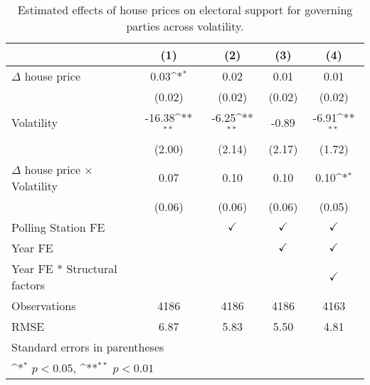 \begin{table}[htbp]\centering
\def\sym#1{\ifmmode^{#1}\else\(^{#1}\)\fi}
\caption{Estimated effects of house prices on electoral support for governing parties across volatility.}
\begin{tabular}{l*{4}{c}}
\hline\hline
                    &\multicolumn{1}{c}{(1)}        &\multicolumn{1}{c}{(2)}        &\multicolumn{1}{c}{(3)}        &\multicolumn{1}{c}{(4)}        \\
\hline
$\Delta$ house price&        0.03\sym{*} &        0.02        &        0.01        &        0.01        \\
                    &      (0.02)        &      (0.02)        &      (0.02)        &      (0.02)        \\
[1em]
Volatility          &      -16.38\sym{**}&       -6.25\sym{**}&       -0.89        &       -6.91\sym{**}\\
                    &      (2.00)        &      (2.14)        &      (2.17)        &      (1.72)        \\
[1em]
$\Delta$ house price $\times$ Volatility&        0.07        &        0.10        &        0.10        &        0.10\sym{*} \\
                    &      (0.06)        &      (0.06)        &      (0.06)        &      (0.05)        \\
[1em]
\hline Polling Station FE&                    &$\checkmark$        &$\checkmark$        &$\checkmark$        \\
[1em]
Year FE             &                    &                    &$\checkmark$        &$\checkmark$        \\
[1em]
Year FE * Structural factors&                    &                    &                    &$\checkmark$        \\
\hline
Observations        &        4186        &        4186        &        4186        &        4163        \\
RMSE                &        6.87        &        5.83        &        5.50        &        4.81        \\
\hline\hline
\multicolumn{5}{l}{\footnotesize Standard errors in parentheses}\\
\multicolumn{5}{l}{\footnotesize \sym{*} \(p<0.05\), \sym{**} \(p<0.01\)}\\
\end{tabular}
\end{table}
